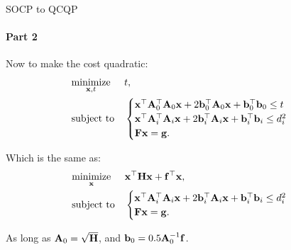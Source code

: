 \documentclass{beamer}
\begin{document}
\begin{frame}{SOCP to QCQP}
\framesubtitle{Part 2}
\begin{flushleft}


Now to make the cost quadratic:
%
\begin{equation}
\begin{aligned}
& \underset{\mathbf{x}, t}{\text{minimize}}
& & t, \\
& \text{subject to}
& & \begin{cases}
    \mathbf{x}^\top \mathbf{A}_0^\top \mathbf{A}_0 \mathbf{x} + 
    2 \mathbf{b}_0^\top \mathbf{A}_0\mathbf{x} + 
    \mathbf{b}_0^\top \mathbf{b}_0  \leq t\\
    \mathbf{x}^\top \mathbf{A}_i^\top \mathbf{A}_i \mathbf{x} + 
    2 \mathbf{b}_i^\top \mathbf{A}_i\mathbf{x} + 
    \mathbf{b}_i^\top \mathbf{b}_i  \leq d_i^2\\
    \mathbf{F}\mathbf{x} = \mathbf{g}.
    \end{cases}
\end{aligned}
\end{equation}

Which is the same as:
%
\begin{equation}
\begin{aligned}
& \underset{\mathbf{x}}{\text{minimize}}
& & \mathbf{x}^\top \mathbf{H} \mathbf{x} + \mathbf{f}^\top\mathbf{x}, \\
& \text{subject to}
& & \begin{cases}
    \mathbf{x}^\top \mathbf{A}_i^\top \mathbf{A}_i \mathbf{x} + 
    2 \mathbf{b}_i^\top \mathbf{A}_i\mathbf{x} + 
    \mathbf{b}_i^\top \mathbf{b}_i  \leq d_i^2\\
    \mathbf{F}\mathbf{x} = \mathbf{g}.
    \end{cases}
\end{aligned}
\end{equation}

As long as $\mathbf{A}_0 = \sqrt{\mathbf{H}}$, and $\mathbf{b}_0 = 0.5 \mathbf{A}_0^{-1} \mathbf{f}$.

\end{flushleft}
\end{frame}
\end{document}
